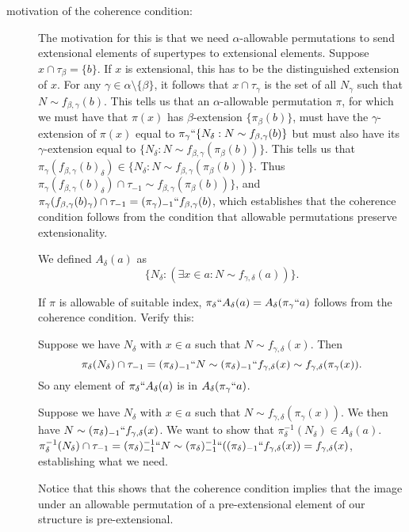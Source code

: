 \documentclass[112pt]{article}
\begin{document}
\begin{description}
\item[motivation of the coherence condition:]  The motivation for this is that we need $\alpha$-allowable permutations to send extensional elements of supertypes to extensional elements.  Suppose
$x \cap \tau_\beta = \{b\}$.  If $x$ is extensional, this has to be the distinguished extension of $x$.  For any $\gamma \in \alpha \setminus \{\beta\}$,
it follows that $x \cap \tau_\gamma$ is the set of all $N_\gamma$ such that $N \sim f_{\beta,\gamma}(b)$.  This tells us that an $\alpha$-allowable permutation $\pi$, for which we must have that $\pi(x)$ has $\beta$-extension $\{\pi_\beta(b)\}$, must have the  $\gamma$-extension of $\pi(x)$ equal to $\pi_\gamma``\{N_\delta:N \sim f_{\beta,\gamma}(b)\}$
but must also have its $\gamma$-extension equal to $\{N_\delta:N \sim f_{\beta,\gamma}(\pi_\beta(b))\}$.  This tells us that $\pi_\gamma(f_{\beta,\gamma}(b)_\delta) \in \{N_\delta:N \sim f_{\beta,\gamma}(\pi_\beta(b))\}$.  Thus $\pi_\gamma(f_{\beta,\gamma}(b)_\delta)\cap \tau_{-1} \sim f_{\beta,\gamma}(\pi_\beta(b))\}$, and $\pi_\gamma(f_{\beta,\gamma}(b)_\gamma)\cap \tau_{-1} = (\pi_\gamma)_{-1}``f_{\beta,\gamma}(b)$, which establishes that the coherence condition follows from the condition that allowable permutations preserve extensionality.

We defined $A_\delta(a)$ as $$\{N_\delta:(\exists x \in a:N \sim f_{\gamma,\delta}(a))\}.$$

If $\pi$ is allowable of suitable index, $\pi_\delta``A_\delta(a)= A_\delta(\pi_\gamma``a)$ follows from the coherence condition.  Verify this:

Suppose we have $N_\delta$ with $x \in a$ such that $N \sim f_{\gamma,\delta}(x)$.  Then $$\pi_\delta(N_\delta)  \cap \tau_{-1} = (\pi_\delta)_{-1}``N \sim (\pi_\delta)_{-1}``f_{\gamma,\delta}(x) \sim f_{\gamma,\delta}(\pi_\gamma(x)).$$  So any element of $\pi_\delta``A_\delta(a)$ is in $A_\delta(\pi_\gamma``a)$.

Suppose we have $N_\delta$ with $x \in a$ such that $N \sim f_{\gamma,\delta}(\pi_\gamma(x))$.  We then have $N \sim (\pi_\delta)_{-1}``f_{\gamma,\delta}(x)$.  We want to show that $\pi_\delta^{-1}(N_\delta) \in A_\delta(a)$.  $\pi_\delta^{-1}(N_\delta) \cap \tau_{-1} = (\pi_\delta)_{-1}^{-1}``N \sim 
(\pi_\delta)_{-1}^{-1}``((\pi_\delta)_{-1}``f_{\gamma,\delta}(x)) = f_{\gamma,\delta}(x)$, establishing what we need.

Notice that this shows that the coherence condition implies that the image under an allowable permutation of a pre-extensional element of our structure is pre-extensional.


\end{description}
\end{document}
